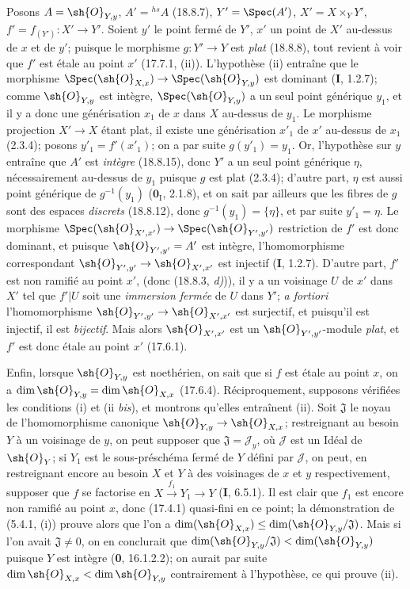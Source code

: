 Posons $A=\sh{O}_{Y,y}$, $A'={}^{hs}\!A$ (18.8.7), $Y'=\Spec(A')$, $X'=X\times_Y Y'$, $f'=f_{(Y')}:X'\to Y'$. Soient $y'$ le point fermé de $Y'$, $x'$ un point de $X'$ au-dessus de $x$ et de $y'$; puisque le morphisme $g:Y'\to Y$ est \emph{plat} (18.8.8), tout revient à voir que $f'$ est étale au point $x'$ (17.7.1, (ii)). L'hypothèse (ii) entraîne que le morphisme $\Spec(\sh{O}_{X,x})\to\Spec(\sh{O}_{Y,y})$ est dominant (\textbf{I}, 1.2.7); comme $\sh{O}_{Y,y}$ est intègre, $\Spec(\sh{O}_{Y,y})$ a un seul point générique $y_1$, et il y a donc une générisation $x_1$ de $x$ dans $X$ au-dessus de $y_1$. Le morphisme projection $X'\to X$ étant plat, il existe une générisation $x'_1$ de $x'$ au-dessus de $x_1$ (2.3.4); posons $y'_1=f'(x'_1)$; on a par suite $g(y'_1)=y_1$. Or, l'hypothèse sur $y$ entraîne que $A'$ est \emph{intègre} (18.8.15), donc $Y'$ a un seul point générique $\eta$, nécessairement au-dessus de $y_1$ puisque $g$
est plat (2.3.4); d'autre part, $\eta$ est aussi point générique de $g^{-1}(y_1)$ ($\mathbf{0}_{\mathrm I}$, 2.1.8), et on sait par ailleurs que les fibres de $g$ sont des espaces \emph{discrets} (18.8.12), donc $g^{-1}(y_1)=\{\eta\}$, et par suite $y'_1=\eta$. Le morphisme $\Spec(\sh{O}_{X',x'})\to\Spec(\sh{O}_{Y',y'})$ restriction de $f'$ est donc dominant, et puisque $\sh{O}_{Y',y'}=A'$ est intègre, l'homomorphisme correspondant $\sh{O}_{Y',y'}\to\sh{O}_{X',x'}$ est injectif (\textbf{I}, 1.2.7). D'autre part, $f'$ est non ramifié au point $x'$, (donc (18.8.3, \emph{d)})), il y a un voisinage $U$ de $x'$ dans $X'$ tel que $f'|U$ soit une \emph{immersion fermée} de $U$ dans $Y'$; \emph{a fortiori} l'homomorphisme $\sh{O}_{Y',y'}\to\sh{O}_{X',x'}$ est surjectif, et puisqu'il est injectif, il est \emph{bijectif}. Mais alors $\sh{O}_{X',x'}$ est un $\sh{O}_{Y',y'}$-module \emph{plat}, et $f'$ est donc étale au point $x'$ (17.6.1).

Enfin, lorsque $\sh{O}_{Y,y}$ est noethérien, on sait que si $f$ est étale au point $x$, on a $\dim\sh{O}_{Y,y}=\dim\sh{O}_{X,x}$ (17.6.4). Réciproquement, supposons vérifiées les conditions (i) et (ii \emph{bis}), et montrons qu'elles entraînent (ii). Soit $\mathfrak J$ le noyau de l'homomorphisme canonique $\sh{O}_{Y,y}\to\sh{O}_{X,x}$; restreignant au besoin $Y$ à un voisinage de $y$, on peut supposer que $\mathfrak J=\mathscr{J}_y$, où $\mathscr{J}$ est un Idéal de $\sh{O}_Y$; si $Y_1$ est le sous-préschéma fermé de $Y$ défini par $\mathscr{J}$, on peut, en restreignant encore au besoin $X$ et $Y$ à des voisinages de $x$ et $y$ respectivement, supposer que $f$ se factorise en $X\xrightarrow{f_1}Y_1\to Y$ (\textbf{I}, 6.5.1). Il est clair que $f_1$ est encore non ramifié au point $x$, donc (17.4.1) quasi-fini en ce point; la démonstration de (5.4.1, (i)) prouve alors que l'on a $\dim(\sh{O}_{X,x})\leq\dim(\sh{O}_{Y,y}/\mathfrak J)$. Mais si l'on avait $\mathfrak J\neq0$, on en conclurait que $\dim(\sh{O}_{Y,y}/\mathfrak J)<\dim(\sh{O}_{Y,y})$ puisque $Y$ est intègre (\textbf{0}, 16.1.2.2); on aurait par suite $\dim\sh{O}_{X,x}<\dim\sh{O}_{Y,y}$ contrairement à l'hypothèse, ce qui prouve (ii).

